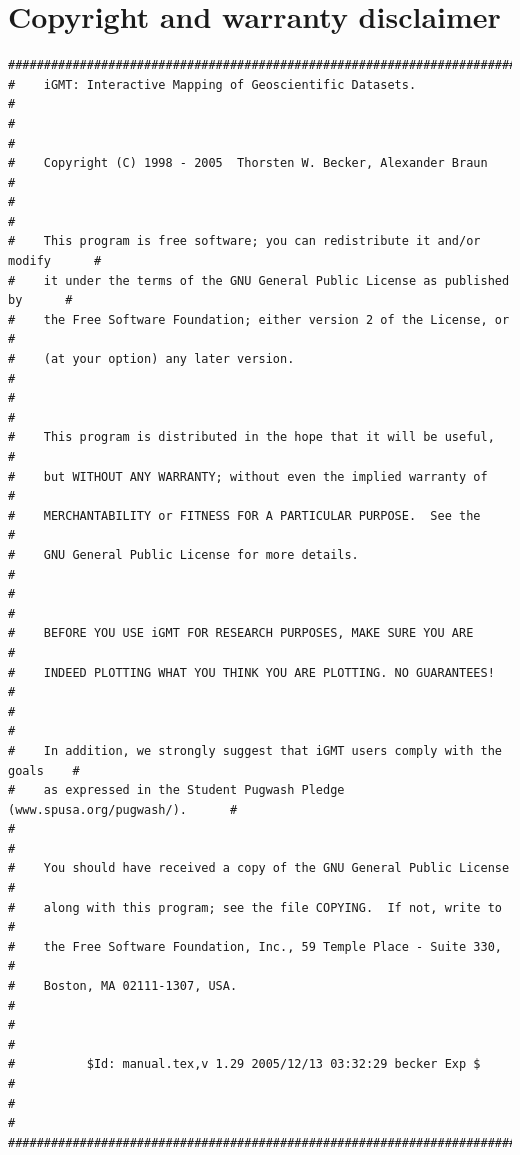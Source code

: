 \documentclass[11pt]{article}
\begin{document}
\section{Copyright and warranty disclaimer}
\vspace*{2cm}
\begin{verbatim}
################################################################################
#    iGMT: Interactive Mapping of Geoscientific Datasets.                      #
#                                                                              #
#    Copyright (C) 1998 - 2005  Thorsten W. Becker, Alexander Braun            #
#                                                                              #
#    This program is free software; you can redistribute it and/or modify      #
#    it under the terms of the GNU General Public License as published by      #
#    the Free Software Foundation; either version 2 of the License, or         #
#    (at your option) any later version.                                       #
#                                                                              #
#    This program is distributed in the hope that it will be useful,           #
#    but WITHOUT ANY WARRANTY; without even the implied warranty of            #
#    MERCHANTABILITY or FITNESS FOR A PARTICULAR PURPOSE.  See the             #
#    GNU General Public License for more details.                              #
#                                                                              #   
#    BEFORE YOU USE iGMT FOR RESEARCH PURPOSES, MAKE SURE YOU ARE              #
#    INDEED PLOTTING WHAT YOU THINK YOU ARE PLOTTING. NO GUARANTEES!           #
#                                                                              #
#    In addition, we strongly suggest that iGMT users comply with the goals    #
#    as expressed in the Student Pugwash Pledge (www.spusa.org/pugwash/).      #
#                                                                              #
#    You should have received a copy of the GNU General Public License         #
#    along with this program; see the file COPYING.  If not, write to          #
#    the Free Software Foundation, Inc., 59 Temple Place - Suite 330,          #
#    Boston, MA 02111-1307, USA.                                               #
#                                                                              #
#          $Id: manual.tex,v 1.29 2005/12/13 03:32:29 becker Exp $             #
#                                                                              #
################################################################################
\end{verbatim}
\clearpage
\end{document}
